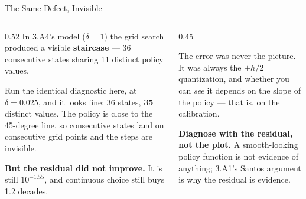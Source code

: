 \begin{frame}{The Same Defect, Invisible}
\begin{columns}[T]
\begin{column}{0.52\textwidth}
\small
In 3.A4's model ($\delta=1$) the grid search produced a visible \textbf{staircase} --- 36 consecutive states sharing 11 distinct policy values.
\medskip

Run the identical diagnostic here, at $\delta=0.025$, and it looks fine: 36 states, \textbf{35} distinct values. The policy is close to the 45-degree line, so consecutive states land on consecutive grid points and the steps are invisible.
\medskip

\textbf{But the residual did not improve.} It is still $10^{-1.55}$, and continuous choice still buys 1.2 decades.
\end{column}
\begin{column}{0.45\textwidth}
\begin{cautionbox}[title=\textbf{The lesson}]\small
The error was never the picture. It was always the $\pm h/2$ quantization, and whether you can \emph{see} it depends on the slope of the policy --- that is, on the calibration.
\end{cautionbox}
\medskip
\begin{takeawaybox}\footnotesize
\textbf{Diagnose with the residual, not the plot.} A smooth-looking policy function is not evidence of anything; 3.A1's Santos argument is why the residual is evidence.
\end{takeawaybox}
\end{column}
\end{columns}
\end{frame}

